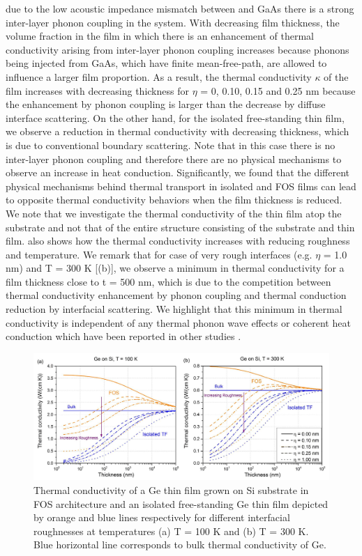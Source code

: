 due to the low acoustic impedance mismatch between  and GaAs there is a strong inter-layer phonon coupling in the system. With decreasing film thickness, the volume fraction in the film in which there is an enhancement of thermal conductivity arising from inter-layer phonon coupling increases because phonons being injected from GaAs, which have finite mean-free-path, are allowed to influence a larger film proportion. As a result, the thermal conductivity $\kappa$ of the film increases with decreasing thickness for $\eta$ = 0, 0.10, 0.15 and 0.25 nm because the enhancement by phonon coupling is larger than the decrease by diffuse interface scattering. On the other hand, for the isolated free-standing thin film, we observe a reduction in thermal conductivity with decreasing thickness, which is due to conventional boundary scattering. Note that in this case there is no inter-layer phonon coupling and therefore there are no physical mechanisms to observe an increase in heat conduction. Significantly, we found that the different physical mechanisms behind thermal transport in isolated and FOS films can lead to opposite thermal conductivity behaviors when the film thickness is reduced. We note that we investigate the thermal conductivity of the thin film atop the substrate and not that of the entire structure consisting of the substrate and thin film.  also shows how the thermal conductivity increases with reducing roughness and temperature. We remark that for case of very rough interfaces (e.g. $\eta$ = 1.0 nm) and \gls{T} = 300 K [(b)], we observe a minimum in thermal conductivity for a film thickness close to \gls{t} = 500 nm, which is due to the competition between thermal conductivity enhancement by phonon coupling and thermal conduction reduction by interfacial scattering. We highlight that this minimum in thermal conductivity is independent of any thermal phonon wave effects or coherent heat conduction which have been reported in other studies \cite{RN253,RN393}. 
\begin{figure}[hbt]
  \centering \includegraphics[width=1.0\textwidth]{figures/ch5/Fig5-fos3.jpg}
  \caption{Thermal conductivity of a Ge thin film grown on Si substrate in FOS architecture and an isolated free-standing Ge thin film depicted by orange and blue lines respectively for different interfacial roughnesses at temperatures (a) \gls{T} = 100 K and (b) \gls{T} = 300 K. Blue horizontal line corresponds to bulk thermal conductivity of Ge.}
    \label{fig:ch5-fos3}
 \end{figure}
